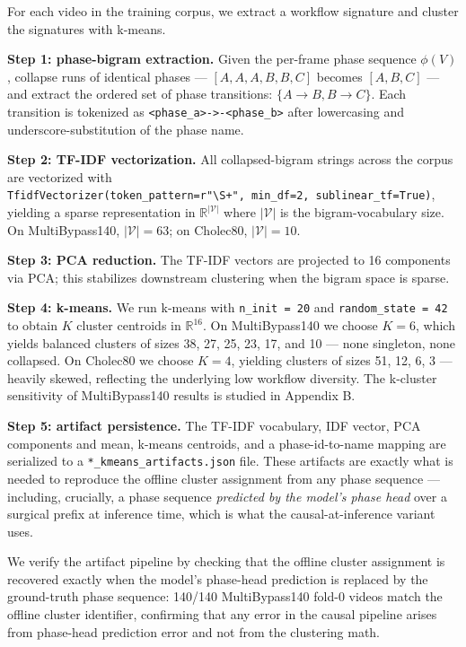 For each video in the training corpus, we extract a workflow signature
and cluster the signatures with k-means.

\textbf{Step 1: phase-bigram extraction.} Given the per-frame phase
sequence \(\phi(V)\), collapse runs of identical phases ---
\([A, A, A, B, B, C]\) becomes \([A, B, C]\) --- and extract the ordered
set of phase transitions: \(\{A \to B, B \to C\}\). Each transition is
tokenized as
\texttt{\textless{}phase\_a\textgreater{}-\textgreater{}-\textless{}phase\_b\textgreater{}}
after lowercasing and underscore-substitution of the phase name.

\textbf{Step 2: TF-IDF vectorization.} All collapsed-bigram strings
across the corpus are vectorized with
\texttt{TfidfVectorizer(token\_pattern=r"\textbackslash{}S+",\ min\_df=2,\ sublinear\_tf=True)},
yielding a sparse representation in \(\mathbb{R}^{|\mathcal{V}|}\) where
\(|\mathcal{V}|\) is the bigram-vocabulary size. On MultiBypass140,
\(|\mathcal{V}| = 63\); on Cholec80, \(|\mathcal{V}| = 10\).

\textbf{Step 3: PCA reduction.} The TF-IDF vectors are projected to 16
components via PCA; this stabilizes downstream clustering when the
bigram space is sparse.

\textbf{Step 4: k-means.} We run k-means with \texttt{n\_init\ =\ 20}
and \texttt{random\_state\ =\ 42} to obtain \(K\) cluster centroids in
\(\mathbb{R}^{16}\). On MultiBypass140 we choose \(K = 6\), which yields
balanced clusters of sizes 38, 27, 25, 23, 17, and 10 --- none
singleton, none collapsed. On Cholec80 we choose \(K = 4\), yielding
clusters of sizes 51, 12, 6, 3 --- heavily skewed, reflecting the
underlying low workflow diversity. The k-cluster sensitivity of
MultiBypass140 results is studied in Appendix B.

\textbf{Step 5: artifact persistence.} The TF-IDF vocabulary, IDF
vector, PCA components and mean, k-means centroids, and a
phase-id-to-name mapping are serialized to a
\texttt{*\_kmeans\_artifacts.json} file. These artifacts are exactly
what is needed to reproduce the offline cluster assignment from any
phase sequence --- including, crucially, a phase sequence
\emph{predicted by the model's phase head} over a surgical prefix at
inference time, which is what the causal-at-inference variant uses.

We verify the artifact pipeline by checking that the offline cluster
assignment is recovered exactly when the model's phase-head prediction
is replaced by the ground-truth phase sequence: 140/140 MultiBypass140
fold-0 videos match the offline cluster identifier, confirming that any
error in the causal pipeline arises from phase-head prediction error and
not from the clustering math.


